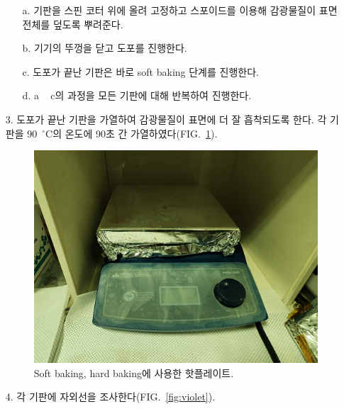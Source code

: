\documentclass[aps,reprint,superscriptaddress,10pt]{revtex4-2}
\begin{document}
\begin{itemize}
  \begin{itemize}
    \item[a. ] 기판을 스핀 코터 위에 올려 고정하고 스포이드를 이용해 감광물질이
    표면 전체를 덮도록 뿌려준다.
    \item[b. ] 기기의 뚜껑을 닫고 도포를 진행한다.
    \item[c. ] 도포가 끝난 기판은 바로 soft baking 단계를 진행한다.
    \item[d. ] a ~ c의 과정을 모든 기판에 대해 반복하여 진행한다. 
  \end{itemize}
  \item[3. ]
  도포가 끝난 기판을 가열하여 감광물질이 표면에 더 잘 흡착되도록 한다.
  각 기판을 90~$^\circ$C의 온도에 90초 간 가열하였다(FIG.~\ref{fig:bake}).
  \begin{figure}[htbp]
    \centering
    \includegraphics[scale=0.04]{bake.JPG}
    \caption{Soft baking, hard baking에 사용한 핫플레이트.}
    \label{fig:bake}
  \end{figure}

  \item[4. ] 각 기판에 자외선을 조사한다(FIG.~\ref{fig:violet}). 


\end{itemize}
\end{document}
